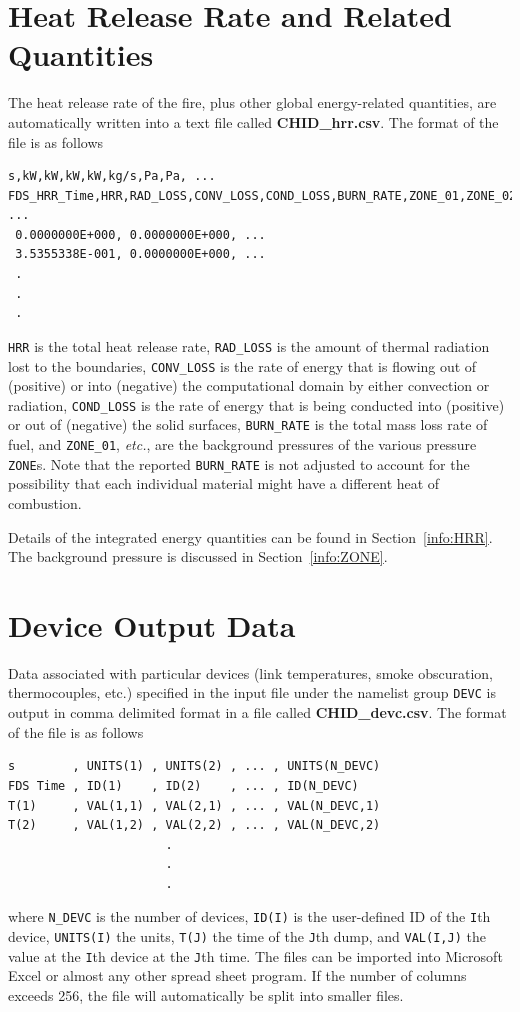 \documentclass[11pt]{book}
\newcommand{\ct}{\tt\small}
\begin{document}
\section{Heat Release Rate and Related Quantities}

\label{out:hrr}
The heat release rate of the fire, plus other global energy-related quantities, are automatically written into a text file
called {\bf CHID\_hrr.csv}. The format of the file is as follows

\footnotesize
\begin{verbatim}
s,kW,kW,kW,kW,kg/s,Pa,Pa, ...
FDS_HRR_Time,HRR,RAD_LOSS,CONV_LOSS,COND_LOSS,BURN_RATE,ZONE_01,ZONE_02, ...
 0.0000000E+000, 0.0000000E+000, ...
 3.5355338E-001, 0.0000000E+000, ...
 .
 .
 .
 \end{verbatim}
\normalsize

\noindent
{\ct HRR} is the total heat release rate, {\ct RAD\_LOSS} is the amount of thermal radiation lost to the boundaries,
{\ct CONV\_LOSS} is the rate of energy that is flowing out of (positive) or into (negative) the computational domain by either convection or radiation,
{\ct COND\_LOSS} is the rate of energy that is being conducted into (positive) or out of (negative) the solid surfaces,
{\ct BURN\_RATE} is the total mass loss rate of fuel, and {\ct ZONE\_01}, {\em etc.}, are the background pressures of the various
pressure {\ct ZONE}s. Note that the reported {\ct BURN\_RATE} is not adjusted to account for the possibility that each individual
material might have a different heat of combustion.

Details of the integrated energy quantities can be found in Section~\ref{info:HRR}. The background pressure is discussed in
Section~\ref{info:ZONE}.





\section{Device Output Data}
\label{out:DEVC}

Data associated with particular devices (link temperatures, smoke obscuration, thermocouples, etc.)
specified in the input file under the namelist
group {\ct DEVC} is output in comma delimited format in a file called
{\bf CHID\_devc.csv}. The format of the file is as follows

\footnotesize
\begin{verbatim}
s        , UNITS(1) , UNITS(2) , ... , UNITS(N_DEVC)
FDS Time , ID(1)    , ID(2)    , ... , ID(N_DEVC)
T(1)     , VAL(1,1) , VAL(2,1) , ... , VAL(N_DEVC,1)
T(2)     , VAL(1,2) , VAL(2,2) , ... , VAL(N_DEVC,2)
                      .
                      .
                      .
\end{verbatim}
\normalsize
where {\ct N\_DEVC} is the number of devices, {\ct ID(I)} is the user-defined
ID of the {\ct I}th device,
{\ct UNITS(I)} the units, {\ct T(J)} the time of the {\ct J}th dump, and
{\ct VAL(I,J)} the value at the {\ct I}th device at the {\ct J}th time.
The files can be imported into Microsoft Excel or almost any other
spread sheet program. If the number of columns exceeds 256, the file will
automatically be split into smaller files.
\end{document}
